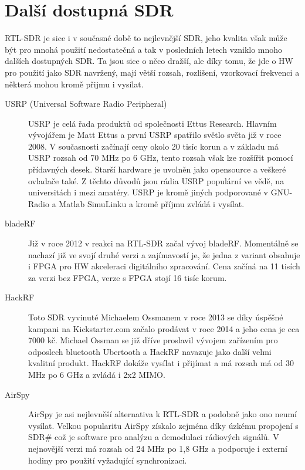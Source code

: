 \documentclass{ctuthesis}
\begin{document}
\section{Další dostupná SDR}
RTL-SDR je sice i v současné době to nejlevnější SDR, jeho kvalita však může být pro mnohá použití nedostatečná a tak v posledních letech vzniklo mnoho dalších dostupných SDR. Ta jsou sice o něco dražší, ale díky tomu, že jde o HW pro použití jako SDR navržený, mají větší rozsah, rozlišení, vzorkovací frekvenci a některá mohou kromě přijmu i vysílat.
\begin{description}
\item[USRP (Universal Software Radio Peripheral)]
USRP je celá řada produktů od společnosti Ettus Research. Hlavním vývojářem je Matt Ettus a první USRP spatřilo světlo světa již v roce 2008. V současnosti začínají ceny okolo 20 tisíc korun a v základu má USRP rozsah od 70 MHz po 6 GHz, tento rozsah však lze rozšířit pomocí přídavných desek. Starší hardware je uvolněn jako opensource a veškeré ovladače také. Z těchto důvodů jsou rádia USRP populární ve vědě, na universitách i mezi amatéry. USRP je kromě jiných podporované v GNU-Radio a Matlab SimuLinku a kromě příjmu zvládá i vysílat. \cite{etusresearch}
\item[bladeRF]
Již v roce 2012 v reakci na RTL-SDR začal vývoj bladeRF. Momentálně se nachazí již ve svojí druhé verzi a zajímavostí je, že jedna z variant obsahuje i FPGA pro HW akceleraci digitálního zpracování. Cena začíná na 11 tisích za verzi bez FPGA, verze s FPGA stojí 16 tisíc korum. \cite{nuand}
\item[HackRF]
Toto SDR vyvinuté Michaelem Ossmanem v roce 2013 se díky úspěšné kampani na Kickstarter.com  začalo prodávat v roce 2014 a jeho cena je cca 7000 kč. Michael Ossman se již dříve proslavil vývojem zařízením pro odposlech bluetooth Ubertooth a HackRF navazuje jako další velmi kvalitní produkt. HackRF dokáže vysílat i přijímat a má rozsah má od 30 MHz po 6 GHz a zvládá i 2x2 MIMO. \cite{hackrf}
\item[AirSpy]
AirSpy je asi nejlevněší alternativa k RTL-SDR a podobně jako ono neumí vysílat. Velkou popularitu AirSpy získalo zejména díky úzkému propojení s SDR\#  což je software pro analýzu a demodulaci rádiových signálů. V nejnovější verzi má rozsah od 24 MHz po 1,8 GHz a podporuje i externí hodiny pro použití vyžadující synchronizaci.
\cite{airspy}
\end{description}
\end{document}

